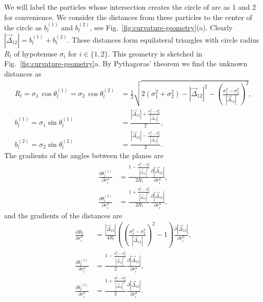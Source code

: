 We will label the particles whose intersection creates the circle of arc as 1 and 2 for convenience.
We consider the distances from these particles to the center of the circle as $b_l^{(1)}$ and $b_l^{(2)}$, see Fig.\ \ref{fig:curvature-geometry}(a).
Clearly $|\vec{\Delta}_{12}| = b_l^{(1)} + b_l^{(2)}$.
These distances form equilateral triangles with circle radius $R_l$ of hypotenuse $\sigma_i$ for $i \in \{1,2\}$.
This geometry is sketched in Fig.\ \ref{fig:curvature-geometry}a.
By Pythagoras' theorem we find the unknown distances as
\begin{align}
  R_l
  = \sigma_1 \, \cos{\theta_l^{(1)}}
  = \sigma_2 \, \cos{\theta_l^{(2)}}
  &= \frac{1}{2} \sqrt{
      2(\sigma_1^2 + \sigma_2^2) - |\vec{\Delta}_{12}|^2 -
      \left( \frac{\sigma_1^2 - \sigma_2^2}{|\vec{\Delta}_{12}|} \right)^2
    }, \\
  b_l^{(1)} = \sigma_1 \sin{\theta_l^{(1)}} &=
  \frac{ |\vec{\Delta}_{12}| + \frac{\sigma_1^2 - \sigma_2^2}{|\vec{\Delta}_{12}|} }{2}, \\
  b_l^{(2)} = \sigma_2 \sin{\theta_l^{(2)}} &=
  \frac{ |\vec{\Delta}_{12}| - \frac{\sigma_1^2 - \sigma_2^2}{|\vec{\Delta}_{12}|} }{2}.
\end{align}
The gradients of the angles between the planes are
\begin{subequations}
\begin{align}
  \frac{\partial \theta_l^{(1)}}{\partial r_i^\alpha} &=
  \frac{ 1 - \frac{\sigma_1^2 - \sigma_2^2}{|\vec{\Delta}_{12}|^2} }{2R_l}
  \frac{\partial |\vec{\Delta}_{12}|}{\partial r_i^\alpha}, \\
  \frac{\partial \theta_l^{(2)}}{\partial r_i^\alpha} &=
  \frac{ 1 + \frac{\sigma_1^2 - \sigma_2^2}{|\vec{\Delta}_{12}|^2} }{2R_l}
  \frac{\partial |\vec{\Delta}_{12}|}{\partial r_i^\alpha},
\end{align}
\end{subequations}
and the gradients of the distances are
\begin{subequations}
\begin{align}
  \frac{\partial R_l}{\partial r_i^\alpha} &=
  \frac{|\vec{\Delta}_{12}|}{4R_l}
  \left(
  \left( \frac{\sigma_1^2 - \sigma_2^2}{|\vec{\Delta}_{12}|} \right)^2 - 1 \right)
  \frac{\partial |\vec{\Delta}_{12}|}{\partial r_i^\alpha}, \\
  \frac{\partial b_l^{(1)}}{\partial r_i^\alpha} &=
  \frac{ 1 - \frac{\sigma_1^2 - \sigma_2^2}{|\vec{\Delta}_{12}|^2} }{2}
  \frac{\partial |\vec{\Delta}_{12}|}{\partial r_i^\alpha}, \\
  \frac{\partial b_l^{(2)}}{\partial r_i^\alpha} &=
  \frac{ 1 + \frac{\sigma_1^2 - \sigma_2^2}{|\vec{\Delta}_{12}|^2} }{2}
  \frac{\partial |\vec{\Delta}_{12}|}{\partial r_i^\alpha}.
\end{align}
\end{subequations}
